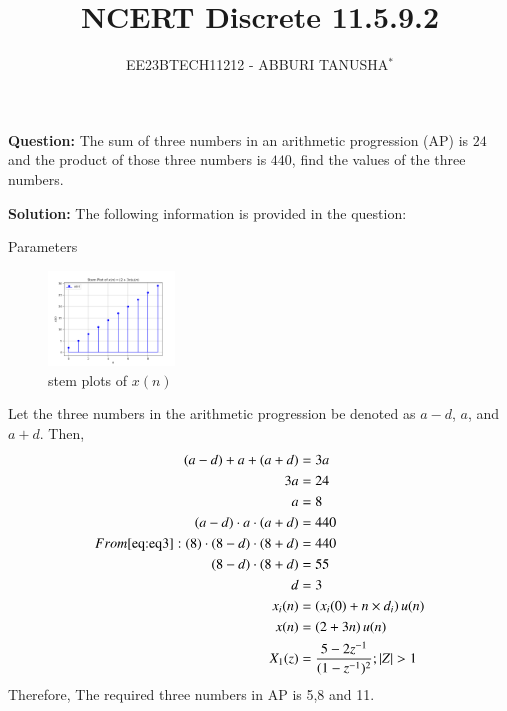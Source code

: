 \documentclass[journal,12pt,twocolumn]{IEEEtran}
\title{NCERT Discrete 11.5.9.2}
\author{EE23BTECH11212 - ABBURI TANUSHA$^{*}$}
\theoremstyle{remark}
\begin{document}
\maketitle

\textbf{Question:} 
The sum of three numbers in an arithmetic progression (AP) is $24$ and the product of those three numbers is $440$, find the values of the three numbers.

\textbf{Solution: }
The following information is provided in the question:
\begin{table}[h]
 	\centering
 	\resizebox{6 cm}{!}{
 		
 	}
 	\vspace{6 pt}
 	\caption{Parameters}
 	\label{tab:my_label} 
 \end{table}
 \begin{figure}[h!]
  \centering
  \includegraphics[width=0.3\textwidth]{figs/Figure_1.png} 
  \caption{stem plots of $x(n)$ }
  \label{fig:1}
\end{figure}
\newline
Let the three numbers in the arithmetic progression be denoted as $a - d$, $a$, and $a + d$. Then,
\begin{align}
    (a - d) + a + (a + d) &= 3a \\
     3a &= 24 \\
    a &= 8 \\
    \label{eq:eq3} 
    (a - d) \cdot a \cdot (a + d) &= 440 \\
  From \eqref{eq:eq3} :
    (8) \cdot (8-d) \cdot (8+d) &= 440 \\
    (8-d) \cdot (8+d) &= 55 \\
    d &= 3 \\
    x_i(n) &= \left(x_i(0) + n \times d_i\right) u(n) \\
    x(n) &= \left(2 + 3n\right)u(n)\\
    X_1(z) &= \frac{5 - 2z^{-1}}{(1-z^{-1})^2} ; |Z|>1
\end{align}
Therefore, The required three numbers in AP is 5,8 and 11.
\end{document}
